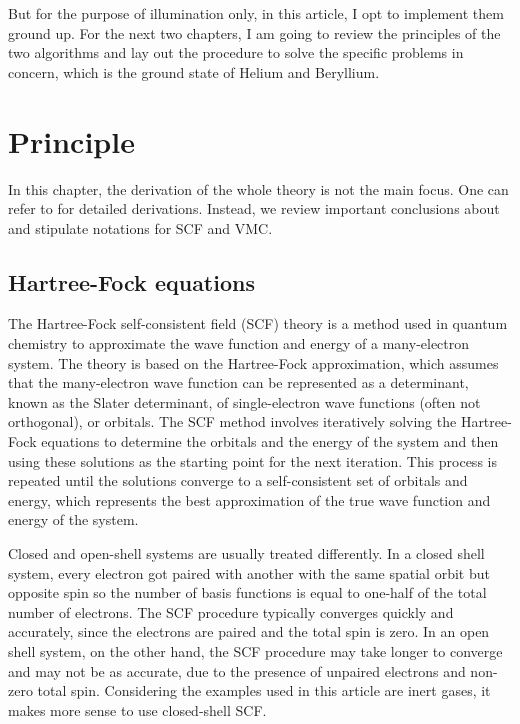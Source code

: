 \documentclass[11pt]{article}
\begin{document}
But for the purpose of illumination only, in this article, I opt to implement them ground up. For the next two chapters, I am going to review the principles of the two algorithms and lay out the procedure to solve the specific problems in concern, which is the ground state of Helium and Beryllium.

\section{Principle}
In this chapter, the derivation of the whole theory is not the main focus. One can refer to \cite{Derivation_of_Fock_matrix} \cite{Review_of_VMC} for detailed derivations. Instead, we review important conclusions about and stipulate notations for SCF and VMC.
\subsection{Hartree-Fock equations}
The Hartree-Fock self-consistent field (SCF) theory is a method used in quantum chemistry to approximate the wave function and energy of a many-electron system. 
The theory is based on the Hartree-Fock approximation, which assumes that the many-electron wave function can be represented as a determinant, known as the Slater determinant, of single-electron wave functions (often not orthogonal), or orbitals. 
The SCF method involves iteratively solving the Hartree-Fock equations to determine the orbitals and the energy of the system and then using these solutions as the starting point for the next iteration. 
This process is repeated until the solutions converge to a self-consistent set of orbitals and energy, which represents the best approximation of the true wave function and energy of the system.

Closed and open-shell systems are usually treated differently. In a closed shell system, every electron got paired with another with the same spatial orbit but opposite spin so the number of basis functions is equal to one-half of the total number of electrons. The SCF procedure typically converges quickly and accurately, since the electrons are paired and the total spin is zero. In an open shell system, on the other hand, the SCF procedure may take longer to converge and may not be as accurate, due to the presence of unpaired electrons and non-zero total spin. \cite{closed-vs-open-shell} Considering the examples used in this article are inert gases, it makes more sense to use closed-shell SCF.
\end{document}

